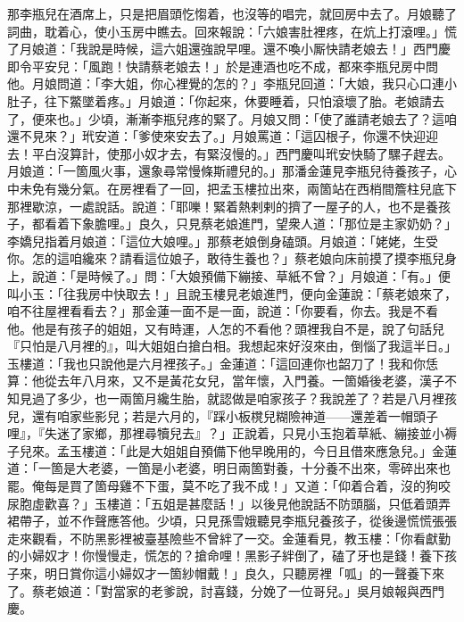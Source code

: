 那李瓶兒在酒席上，只是把眉頭忔㥮着，{}也沒等的唱完，就回房中去了。月娘聽了詞曲，耽着心，使小玉房中瞧去。回來報說：「六娘害肚裡疼，在炕上打滾哩。」慌了月娘道：「我說是時候，這六姐還強說早哩。還不喚小厮快請老娘去！」西門慶即令平安兒：「風跑！快請蔡老娘去！」於是連酒也吃不成，都來李瓶兒房中問他。月娘問道：「李大姐，你心裡覺的怎的？」李瓶兒回道：「大娘，我只心口連小肚子，往下鱉墜着疼。」月娘道：「你起來，休要睡着，只怕滾壞了胎。老娘請去了，便來也。」少頃，漸漸李瓶兒疼的緊了。月娘又問：「使了誰請老娘去了？這咱還不見來？」玳安道：「爹使來安去了。」月娘罵道：「這囚根子，你還不快迎迎去！平白沒算計，使那小奴才去，有緊沒慢的。」{}西門慶叫玳安快騎了騾子趕去。月娘道：「一箇風火事，還象尋常慢條斯禮兒的。」那潘金蓮見李瓶兒待養孩子，心中未免有幾分氣。在房裡看了一回，把孟玉樓拉出來，兩箇站在西梢間簷柱兒底下那裡歇涼，一處說話。說道：「耶嚛！緊着熱剌剌的擠了一屋子的人，也不是養孩子，都看着下象膽哩。」良久，只見蔡老娘進門，望衆人道：「那位是主家奶奶？」李嬌兒指着月娘道：「這位大娘哩。」那蔡老娘倒身磕頭。月娘道：「姥姥，生受你。怎的這咱纔來？請看這位娘子，敢待生養也？」蔡老娘向床前摸了摸李瓶兒身上，說道：「是時候了。」問：「大娘預備下繃接、草紙不曾？」月娘道：「有。」{}便叫小玉：「往我房中快取去！」{}且說玉樓見老娘進門，便向金蓮說：「蔡老娘來了，咱不往屋裡看看去？」那金蓮一面不是一面，說道：「你要看，你去。我是不看他。他是有孩子的姐姐，又有時運，人怎的不看他？頭裡我自不是，說了句話兒『只怕是八月裡的』，叫大姐姐白搶白相。我想起來好沒來由，倒惱了我這半日。」玉樓道：「我也只說他是六月裡孩子。」金蓮道：「這回連你也韶刀了！我和你恁算：他從去年八月來，又不是黃花女兒，當年懷，入門養。一箇婚後老婆，漢子不知見過了多少，也一兩箇月纔生胎，就認做是咱家孩子？我說差了？若是八月裡孩兒，還有咱家些影兒；若是六月的，『踩小板櫈兒糊險神道——還差着一帽頭子哩』，『失迷了家鄉，那裡尋犢兒去』？」{}正說着，只見小玉抱着草紙、繃接並小褥子兒來。孟玉樓道：「此是大姐姐自預備下他早晚用的，今日且借來應急兒。」{}金蓮道：「一箇是大老婆，一箇是小老婆，明日兩箇對養，十分養不出來，零碎出來也罷。俺每是買了箇母雞不下蛋，莫不吃了我不成！」{}又道：「仰着合着，沒的狗咬尿胞虛歡喜？」玉樓道：「五姐是甚麼話！」以後見他說話不防頭腦，只低着頭弄裙帶子，{}並不作聲應答他。少頃，只見孫雪娥聽見李瓶兒養孩子，從後邊慌慌張張走來觀看，不防黑影裡被臺基險些不曾絆了一交。金蓮看見，教玉樓：「你看獻勤的小婦奴才！你慢慢走，慌怎的？搶命哩！黑影子絆倒了，磕了牙也是錢！養下孩子來，明日賞你這小婦奴才一箇紗帽戴！」{}良久，只聽房裡「呱」的一聲養下來了。{}蔡老娘道：「對當家的老爹說，討喜錢，分娩了一位哥兒。」吳月娘報與西門慶。

